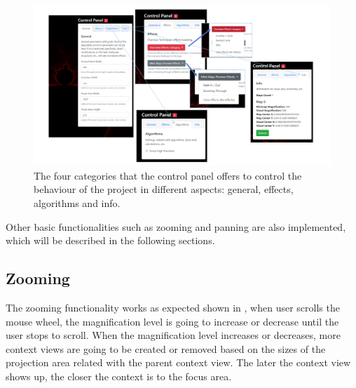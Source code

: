 \begin{figure}[H]
\centering
\includegraphics[width=\textwidth,keepaspectratio]{Figures/Chapter5/fourcate.png}
\decoRule
\caption[The Four Categories of the Control Panel]{The four categories that the control panel offers to control the behaviour of the project in different aspects: general, effects, algorithms and info.}
\label{fig:chap5:fourcate}
\end{figure}

Other basic functionalities such as zooming and panning are also implemented, which will be described in the following sections.

\subsection{Zooming}

The zooming functionality works as expected shown in , when user scrolls the mouse wheel, the magnification level is going to increase or decrease until the user stops to scroll. When the magnification level increases or decreases, more context views are going to be created or removed based on the sizes of the projection area related with the parent context view. The later the context view shows up, the closer the context is to the focus area.

